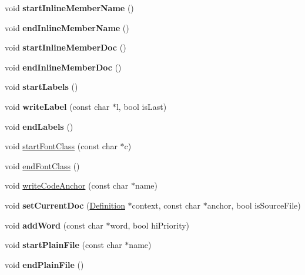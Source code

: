 \begin{DoxyCompactItemize}
void {\bfseries start\+Inline\+Member\+Name} ()
\item 
\mbox{\label{class_output_list_ad8d98f7851b5215e0f810b0cfcc40e91}} 
void {\bfseries end\+Inline\+Member\+Name} ()
\item 
\mbox{\label{class_output_list_a4627e1a2c83cf21e9b63b6c9b99e5381}} 
void {\bfseries start\+Inline\+Member\+Doc} ()
\item 
\mbox{\label{class_output_list_a70aceb24f76c182ccc5f52285aa235e8}} 
void {\bfseries end\+Inline\+Member\+Doc} ()
\item 
\mbox{\label{class_output_list_ac8244f86d2d0ccbf7e9b0641f1d3a8f6}} 
void {\bfseries start\+Labels} ()
\item 
\mbox{\label{class_output_list_ac2958e2ef34e819d208baed9f4d3559a}} 
void {\bfseries write\+Label} (const char $\ast$l, bool is\+Last)
\item 
\mbox{\label{class_output_list_aaf53a952591ed98b004311c5570411a0}} 
void {\bfseries end\+Labels} ()
\item 
void \mbox{\hyperlink{class_output_list_ace178947661035b39f4dc9076595c24f}{start\+Font\+Class}} (const char $\ast$c)
\item 
void \mbox{\hyperlink{class_output_list_a484c1bcfcffe7a6cb94316ac8df64b61}{end\+Font\+Class}} ()
\item 
void \mbox{\hyperlink{class_output_list_ad40cf8ca8c6289590afa5871b8d5d9a0}{write\+Code\+Anchor}} (const char $\ast$name)
\item 
\mbox{\label{class_output_list_a5465259b203bfc5430ebcf7821feb11d}} 
void {\bfseries set\+Current\+Doc} (\mbox{\hyperlink{class_definition}{Definition}} $\ast$context, const char $\ast$anchor, bool is\+Source\+File)
\item 
\mbox{\label{class_output_list_a909e6711f00132f53f9576ccf4e409be}} 
void {\bfseries add\+Word} (const char $\ast$word, bool hi\+Priority)
\item 
\mbox{\label{class_output_list_aa6e78ca438706d0a0bc24bc3e30297d5}} 
void {\bfseries start\+Plain\+File} (const char $\ast$name)
\item 
\mbox{\label{class_output_list_aef22d797dc5dae4fcce9984246587932}} 
void {\bfseries end\+Plain\+File} ()
\end{DoxyCompactItemize}

